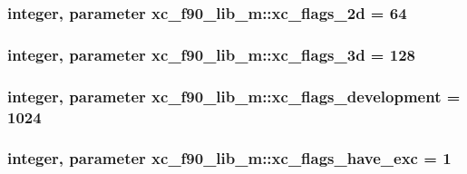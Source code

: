 \hypertarget{classxc__f90__lib__m_a053e8cbd3357101c4d558118a72a90ca}{
\subsubsection[{xc\-\_\-flags\-\_\-2d}]{\setlength{\rightskip}{0pt plus 5cm}integer, parameter xc\-\_\-f90\-\_\-lib\-\_\-m\-::xc\-\_\-flags\-\_\-2d = 64}}\label{classxc__f90__lib__m_a053e8cbd3357101c4d558118a72a90ca}
\hypertarget{classxc__f90__lib__m_a0e438b17e5b4f220f916fba0c191b331}{
\subsubsection[{xc\-\_\-flags\-\_\-3d}]{\setlength{\rightskip}{0pt plus 5cm}integer, parameter xc\-\_\-f90\-\_\-lib\-\_\-m\-::xc\-\_\-flags\-\_\-3d = 128}}\label{classxc__f90__lib__m_a0e438b17e5b4f220f916fba0c191b331}
\hypertarget{classxc__f90__lib__m_a6ba6e34a3c1eeadcaac11e4fec716535}{
\subsubsection[{xc\-\_\-flags\-\_\-development}]{\setlength{\rightskip}{0pt plus 5cm}integer, parameter xc\-\_\-f90\-\_\-lib\-\_\-m\-::xc\-\_\-flags\-\_\-development = 1024}}\label{classxc__f90__lib__m_a6ba6e34a3c1eeadcaac11e4fec716535}
\hypertarget{classxc__f90__lib__m_ae8565a0f068d7c2bcb71972ad9376880}{
\subsubsection[{xc\-\_\-flags\-\_\-have\-\_\-exc}]{\setlength{\rightskip}{0pt plus 5cm}integer, parameter xc\-\_\-f90\-\_\-lib\-\_\-m\-::xc\-\_\-flags\-\_\-have\-\_\-exc = 1}}\label{classxc__f90__lib__m_ae8565a0f068d7c2bcb71972ad9376880}
